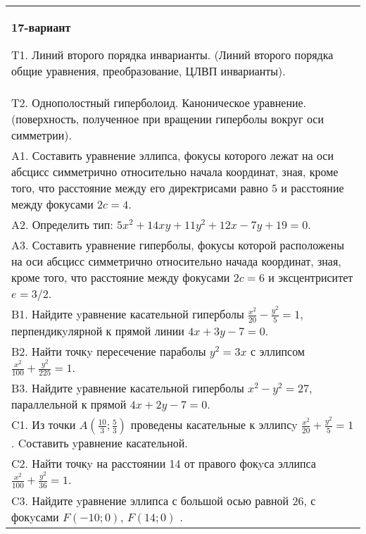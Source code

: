 \documentclass{article}
\begin{document}
\begin{tabular}{m{17cm}}
\textbf{17-вариант}
\newline

T1. Линий второго порядка инварианты. (Линий второго порядка общие уравнения, преобразование, ЦЛВП инварианты).\\

T2. Однополостный гиперболоид. Каноническое уравнение. (поверхность, полученное при вращении гиперболы вокруг оси симметрии).\\

A1. Составить уравнение эллипса, фокусы которого лежат на оси абсцисс симметрично относительно начала координат, зная, кроме того, что расстояние между его директрисами равно $5$ и расстояние между фокусами $2c=4$.\\

A2. Определить тип: $5x^{2}+14xy+11y^{2}+12x-7y+19=0$.\\

A3. Составить уравнение гиперболы, фокусы которой расположены на оси абсцисс симметрично относительно начада координат, зная, кроме того, что расстояние между фокусами $2c=6$ и эксцентриситет $e=3/2$.\\

B1. Найдите yравнение касательной гиперболы $\frac{x^{2}}{20} - \frac{y^{2}}{5} = 1$, перпендикyлярной к прямой линии $4x + 3y - 7 = 0$.  \\

B2. Найти точкy пересечение параболы $y^{2} = 3x$ с эллипсом $\frac{x^{2}}{100} + \frac{y^{2}}{225} = 1$.  \\

B3. Найдите yравнение касательной гиперболы $x^{2} - y^{2} = 27$, параллельной к прямой $4x + 2y - 7 = 0$.  \\

C1. Из точки $A(\frac{10}{3};\frac{5}{3})$ проведены касательные к эллипсy $\frac{x^{2}}{20}+\frac{y^{2}}{5}=1$ . Cоставить yравнение касательной.  \\

C2. Найти точкy на расстоянии 14 от правого фокyса эллипса $\frac{x^{2}}{100}+\frac{y^{2}}{36}=1$.\\

C3. Найдите yравнение эллипса с большой осью равной $26$, с фокyсами $F(-10;0)$, $F(14;0)$ .  \\

\end{tabular}
\vspace{1cm}
\end{document}
